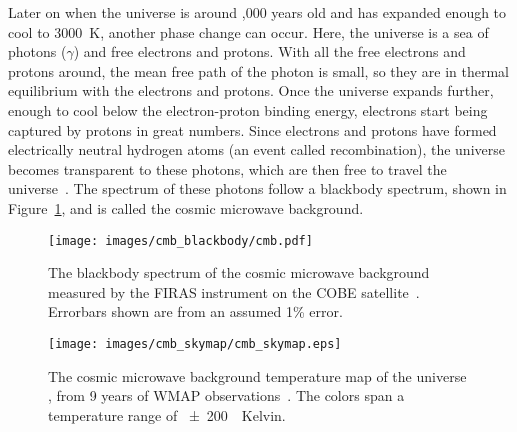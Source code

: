 Later on when the universe is around ,000 years old and has expanded enough to cool to \nicetilde\SI{3000}{K}, another phase change can occur.
Here, the universe is a sea of photons ($\gamma$) and free electrons and protons.
With all the free electrons and protons around, the mean free path of the photon is small, so they are in thermal equilibrium with the electrons and protons.
Once the universe expands further, enough to cool below the electron-proton binding energy, electrons start being captured by protons in great numbers.
Since electrons and protons have formed electrically neutral hydrogen atoms (an event called recombination), the universe becomes transparent to these photons, which are then free to travel the universe~\cite{planck2015,theEarlyUniverse,CMBFundamentals,CMBFlat}.
The spectrum of these photons follow a blackbody spectrum, shown in Figure~\ref{fig:cmb_black}, and is called the cosmic microwave background.

\begin{figure}[t]
  \centering
  \texttt{[image: images/cmb\_blackbody/cmb.pdf]}
  \caption[Cosmic Microwave Background Blackbody]{
    The blackbody spectrum of the cosmic microwave background measured by the FIRAS instrument on the COBE satellite~\cite{mather1990}.
    Errorbars shown are from an assumed 1\% error.
  }
  \label{fig:cmb_black}
\end{figure}


\begin{figure}[t]
  \centering
  \texttt{[image: images/cmb\_skymap/cmb\_skymap.eps]}
  \caption[Cosmic Microwave Background Skymap]{
    The cosmic microwave background temperature map of the universe \cite{wmap_skymap}, from 9 years of WMAP observations~\cite{wmap9year}.
    The colors span a temperature range of \SI{\pm200}{\mu{}Kelvin}.
  }
  \label{fig:cmb}
\end{figure}


